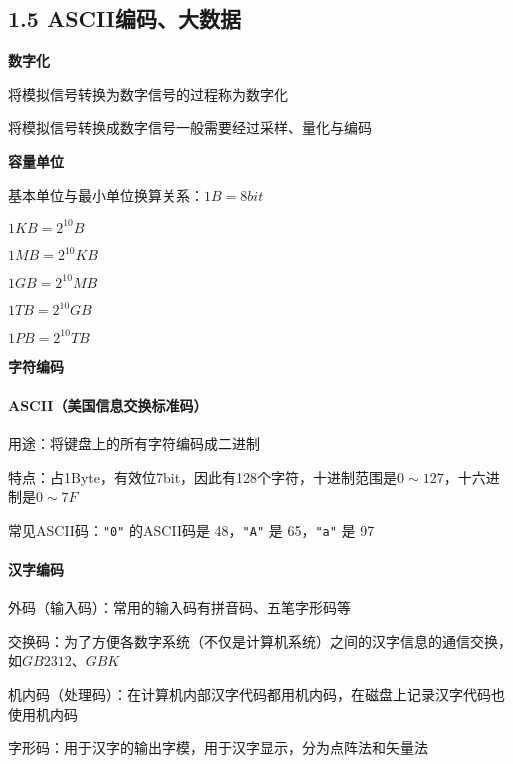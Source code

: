 \setcounter{section}{1}
\setcounter{subsection}{2}
\subsection{1.5 ASCII编码、大数据}



\begin{compactenum}[1.]
\item \textbf{数字化}

	\begin{compactitem}
	\item  将模拟信号转换为数字信号的过程称为数字化
	\item  将模拟信号转换成数字信号一般需要经过采样、量化与编码
	\end{compactitem}

\item \textbf{容量单位}

	\begin{compactitem}
	\item  基本单位与最小单位换算关系：$1B = 8bit$
	\item  $1KB = 2^{10}B$
	\item  $1MB = 2^{10}KB$
	\item  $1GB = 2^{10}MB$
	\item  $1TB = 2^{10}GB$
	\item  $1PB = 2^{10}TB$
	\end{compactitem}

\item \textbf{字符编码}
	\paragraph{ASCII（美国信息交换标准码）}
	\begin{compactitem}

	\item  用途：将键盘上的所有字符编码成二进制
	\item  特点：占1Byte，有效位7bit，因此有128个字符，十进制范围是$0 \sim 127$，十六进制是$0 \sim 7F$
	\item  常见ASCII码：\texttt{"0"} 的ASCII码是 48，\texttt{"A"} 是
	  65，\texttt{"a"} 是 97
	\end{compactitem}

	\paragraph{汉字编码}
	\begin{compactitem}
	\item  外码（输入码）：常用的输入码有拼音码、五笔字形码等
	\item  交换码：为了方便各数字系统（不仅是计算机系统）之间的汉字信息的通信交换，如$GB2312$、$GBK$
	\item  机内码（处理码）：在计算机内部汉字代码都用机内码，在磁盘上记录汉字代码也使用机内码
	\item  字形码：用于汉字的输出字模，用于汉字显示，分为点阵法和矢量法
	\end{compactitem}


\end{compactenum}
